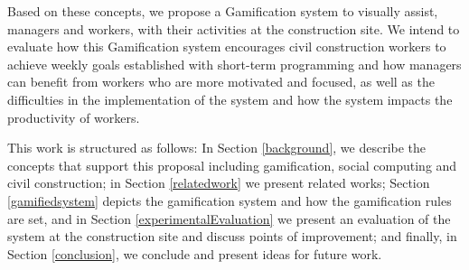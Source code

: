 Based on these concepts, we propose a Gamification system to visually assist, managers and workers, with their activities at the construction site. We intend to evaluate how this Gamification system encourages civil construction workers to achieve weekly goals established with short-term programming and how managers can benefit from workers who are more motivated and focused, as well as the difficulties in the implementation of the system and how the system impacts the productivity of workers.

This work is structured as follows: In Section \ref{background}, we describe the concepts that support this proposal including gamification, social computing and civil construction; in Section \ref{relatedwork} we present related works; Section \ref{gamifiedsystem} depicts the gamification system and how the gamification rules are set, and in Section \ref{experimentalEvaluation} we present an evaluation of the system at the construction site and discuss points of improvement; and finally, in Section \ref{conclusion}, we conclude and present ideas for future work.

